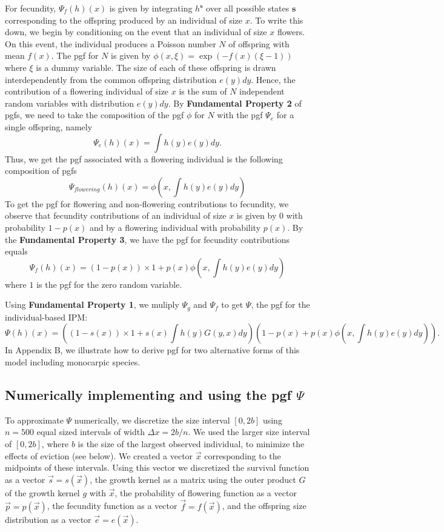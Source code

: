 \documentclass[12pt]{amsart}\usepackage[]{graphicx}\usepackage[]{color}
\def\s{\mathbf s}
\begin{document}
For fecundity, $\Psi_f(h)(x)$ is given by integrating $h^\s$ over all possible states $\s$ corresponding to the offspring produced by an individual of size $x$.  To write this down, we begin by conditioning on the event that an individual of size $x$ flowers. On this event, the individual produces a Poisson number $N$ of offspring with mean $f(x)$. The pgf for $N$ is given by $\phi(x, \xi)=\exp(-f(x)(\xi-1))$ where $\xi$ is a dummy variable. The size of each of these offspring is drawn interdependently from the common offspring distribution $e(y)dy$. Hence, the contribution of a flowering individual of size $x$ is the sum of $N$ independent random variables with distribution $e(y)dy$. By \textbf{Fundamental Property 2} of pgfs, we need to take the composition of the pgf $\phi$ for $N$ with the pgf $\Psi_e$ for a single offspring, namely
\[
\Psi_e(h)(x)=\int h(y)e(y)dy.
\]
Thus, we get the pgf associated with a flowering individual is the following composition of pgfs
\[
\Psi_{flowering}(h)(x)=\phi(x, \int h(y)e(y)dy)
\]
To get the pgf for flowering and non-flowering contributions to fecundity, we observe that fecundity contributions of an individual of size $x$ is given by $0$ with probability $1-p(x)$ and by a flowering individual with probability $p(x)$. By the \textbf{Fundamental Property 3}, we have the pgf for fecundity contributions equals
\[
\Psi_f (h)(x)=(1-p(x))\times 1+p(x)\phi(x, \int h(y)e(y)dy)
\]
where $1$ is the pgf for the zero random variable. 

Using \textbf{Fundamental Property 1}, we muliply $\Psi_g$ and $\Psi_f$ to get $\Psi$, the pgf for the individual-based IPM:
\[
\Psi(h)(x)=\left((1-s(x))\times 1 + s(x)\int h(y)G(y, x)dy\right)\left(1-p(x)+p(x)\phi(x, \int h(y)e(y)dy)\right).
\]
In Appendix B, we illustrate how to derive pgf for two alternative forms of this model including monocarpic species. 

\subsection*{Numerically implementing and using the pgf $\Psi$}

To approximate $\Psi$ numerically, we discretize the size interval $[0, 2b]$ using $n=500$ equal sized intervals of width $\Delta x=2b/n$. We used the larger size interval of $[0, 2b]$, where $b$ is the size of the largest observed individual, to minimize the effects of eviction (see below). We created a vector $\vec x$ corresponding to the midpoints of these intervals. Using this vector we discretized the survival function as a vector $\vec s=s(\vec x)$, the growth kernel as a matrix using the outer product $G$ of the growth kernel $g$ with $\vec x$, the probability of flowering function as a vector $\vec p=p(\vec x)$, the fecundity function as a vector $\vec f=f(\vec x)$, and the offspring size distribution as a vector $\vec e=e(\vec x)$.
\end{document}
